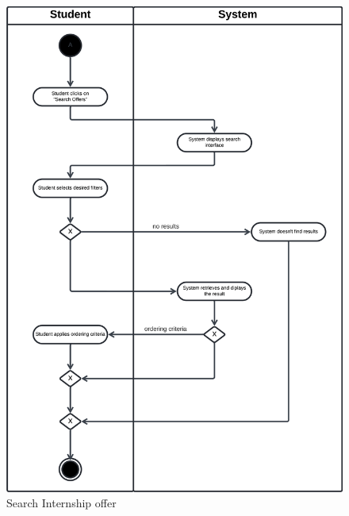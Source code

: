 \begin{figure}[H]
    \begin{center}
         \includegraphics[width=1\linewidth]{LaTeXCode/images/activity diagram/UC8.png}
         \caption{Search Internship offer}
         \label{fig:search_offer_ad}
     \end{center}
\end{figure}

\newpage

